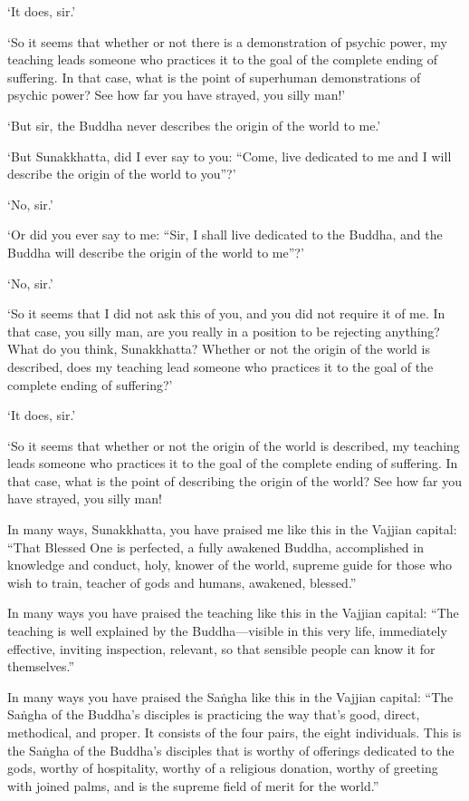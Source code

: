 \documentclass[12pt,openany]{book}%
\begin{document}
‘It does, sir.’ 

‘So it seems that whether or not there is a demonstration of psychic power, my teaching leads someone who practices it to the goal of the complete ending of suffering. In that case, what is the point of superhuman demonstrations of psychic power? See how far you have strayed, you silly man!’ 

‘But sir, the Buddha never describes the origin of the world to me.’ 

‘But Sunakkhatta, did I ever say to you: “Come, live dedicated to me and I will describe the origin of the world to you”?’ 

‘No, sir.’ 

‘Or did you ever say to me: “Sir, I shall live dedicated to the Buddha, and the Buddha will describe the origin of the world to me”?’ 

‘No, sir.’ 

‘So it seems that I did not ask this of you, and you did not require it of me. In that case, you silly man, are you really in a position to be rejecting anything? What do you think, Sunakkhatta? Whether or not the origin of the world is described, does my teaching lead someone who practices it to the goal of the complete ending of suffering?’ 

‘It does, sir.’ 

‘So it seems that whether or not the origin of the world is described, my teaching leads someone who practices it to the goal of the complete ending of suffering. In that case, what is the point of describing the origin of the world? See how far you have strayed, you silly man! 

In many ways, Sunakkhatta, you have praised me like this in the Vajjian capital: “That Blessed One is perfected, a fully awakened Buddha, accomplished in knowledge and conduct, holy, knower of the world, supreme guide for those who wish to train, teacher of gods and humans, awakened, blessed.” 

In many ways you have praised the teaching like this in the Vajjian capital: “The teaching is well explained by the Buddha—visible in this very life, immediately effective, inviting inspection, relevant, so that sensible people can know it for themselves.” 

In many ways you have praised the \textsanskrit{Saṅgha} like this in the Vajjian capital: “The \textsanskrit{Saṅgha} of the Buddha’s disciples is practicing the way that’s good, direct, methodical, and proper. It consists of the four pairs, the eight individuals. This is the \textsanskrit{Saṅgha} of the Buddha’s disciples that is worthy of offerings dedicated to the gods, worthy of hospitality, worthy of a religious donation, worthy of greeting with joined palms, and is the supreme field of merit for the world.” 
\end{document}

